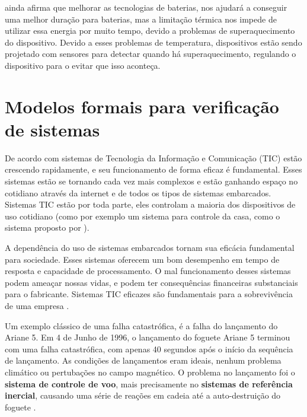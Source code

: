  ainda afirma que melhorar as tecnologias de baterias, nos ajudará a conseguir uma melhor duração para baterias, mas a limitação térmica nos impede de utilizar essa energia por muito tempo, devido a problemas de superaquecimento do dispositivo. Devido a esses problemas de temperatura, dispositivos estão sendo projetado com sensores para detectar quando há superaquecimento, regulando o dispositivo para o evitar que isso aconteça. 


\section{Modelos formais para verificação de sistemas}
 
De acordo com  sistemas de Tecnologia da Informação e Comunicação (TIC) estão crescendo rapidamente, e seu funcionamento de forma eficaz é fundamental. Esses sistemas estão se tornando cada vez mais complexos e estão ganhando espaço no cotidiano através da internet e de todos os tipos de sistemas embarcados. Sistemas TIC estão por toda parte, eles controlam a maioria dos dispositivos de uso cotidiano (como por exemplo um sistema para controle da casa, como o sistema proposto por ).

A dependência do uso de sistemas embarcados tornam sua eficácia fundamental para sociedade. Esses sistemas oferecem um bom desempenho em tempo de resposta e capacidade de processamento. O mal funcionamento desses sistemas podem ameaçar nossas vidas, e podem ter consequências financeiras substanciais para o fabricante. Sistemas TIC eficazes são fundamentais para a sobrevivência de uma empresa \cite{Baier:2008}.

Um exemplo clássico de uma falha catastrófica, é a falha do lançamento do Ariane 5. Em 4 de Junho de 1996, o lançamento do foguete Ariane 5 terminou com uma falha catastrófica, com apenas 40 segundos após o início da sequência de lançamento. As condições de lançamentos eram ideais, nenhum problema climático ou pertubações no campo magnético. O problema no lançamento foi o \textbf{sistema de controle de voo}, mais precisamente no \textbf{sistemas de referência inercial}, causando uma série de reações em cadeia até a auto-destruição do foguete \cite{lions1996ariane}.

